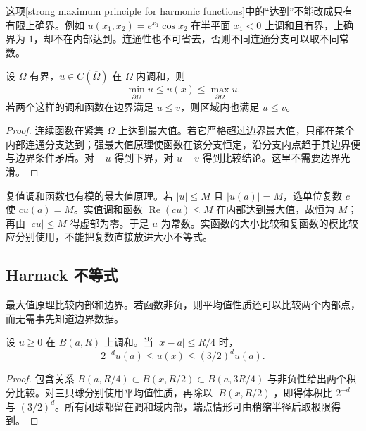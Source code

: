 这项[strong maximum principle for harmonic functions]中的“达到”不能改成只有有限上确界。例如 \(u(x_1,x_2)=e^{x_1}\cos x_2\) 在半平面 \(x_1<0\) 上调和且有界，上确界为 \(1\)，却不在内部达到。连通性也不可省去，否则不同连通分支可以取不同常数。

\begin{corollary}[边界最大值与比较]\label{b2:cor:13-boundary-maximum}
设 \(\Omega\) 有界，\(u\in C(\overline\Omega)\) 在 \(\Omega\) 内调和，则
\[
 \min_{\partial\Omega}u\leq u(x)\leq\max_{\partial\Omega}u.
\]
若两个这样的调和函数在边界满足 \(u\leq v\)，则区域内也满足 \(u\leq v\)。
\end{corollary}
\begin{proof}
连续函数在紧集 \(\overline\Omega\) 上达到最大值。若它严格超过边界最大值，只能在某个内部连通分支达到；强最大值原理使函数在该分支恒定，沿分支内点趋于其边界便与边界条件矛盾。对 \(-u\) 得到下界，对 \(u-v\) 得到比较结论。这里不需要边界光滑。
\end{proof}

复值调和函数也有模的最大值原理。若 \(|u|\leq M\) 且 \(|u(a)|=M\)，选单位复数 \(c\) 使 \(cu(a)=M\)。实值调和函数 \(\operatorname{Re}(cu)\leq M\) 在内部达到最大值，故恒为 \(M\)；再由 \(|cu|\leq M\) 得虚部为零。于是 \(u\) 为常数。实函数的大小比较和复函数的模比较应分别使用，不能把复数直接放进大小不等式。

\subsection{Harnack 不等式}
\label{b2:subsec:130103}

最大值原理比较内部和边界。若函数非负，则平均值性质还可以比较两个内部点，而无需事先知道边界数据。

\begin{lemma}\label{b2:lem:13-local-harnack}
设 \(u\geq0\) 在 \(B(a,R)\) 上调和。当 \(|x-a|\leq R/4\) 时，
\[
 2^{-d}u(a)\leq u(x)\leq(3/2)^d u(a).
\]
\end{lemma}
\begin{proof}
包含关系 \(B(a,R/4)\subset B(x,R/2)\subset B(a,3R/4)\) 与非负性给出两个积分比较。对三只球分别使用平均值性质，再除以 \(|B(x,R/2)|\)，即得体积比 \(2^{-d}\) 与 \((3/2)^d\)。所有闭球都留在调和域内部，端点情形可由稍缩半径后取极限得到。
\end{proof}

